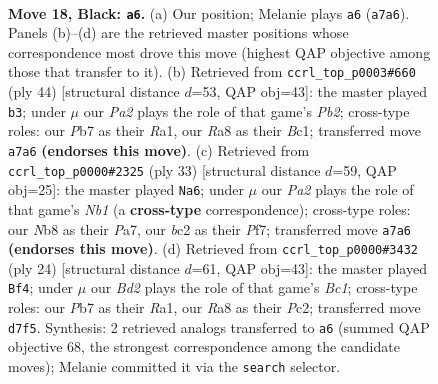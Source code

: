 \documentclass[11pt]{article}
\begin{document}
\clearpage

\begin{figure}[p]\centering
\begin{subfigure}{0.46\textwidth}\centering
\resizebox{\linewidth}{!}{%
\newchessgame
\chessboard[
  setfen={rn3r1b/pppb1k2/5pp1/4p2p/2P1P3/2N1BN2/PPB2PP1/R3K1R1 b - - 7 18},
  showmover=false,
  pgfstyle=straightmove, color=movearrow, markmove={a7-a6}
]}
\caption{}
\end{subfigure}\hfill
\begin{subfigure}{0.46\textwidth}\centering
\resizebox{\linewidth}{!}{%
\newchessgame
\chessboard[
  setfen={1r2r1k1/1pp2ppp/p2b1n2/3P4/2nN4/6P1/PP3PBP/R1BR2K1 w - - 10 23},
  showmover=false,
  pgfstyle=straightmove, color=movearrow, markmove={b2-b3}
]}
\caption{}
\end{subfigure}
\\[4pt]
\begin{subfigure}{0.46\textwidth}\centering
\resizebox{\linewidth}{!}{%
\newchessgame
\chessboard[
  setfen={rn3rk1/pp2ppbp/2p3p1/4P3/2NP4/4B3/PP3PPP/2R1K2R b K - 0 17},
  showmover=false,
  pgfstyle=straightmove, color=movearrow, markmove={b8-a6}
]}
\caption{}
\end{subfigure}\hfill
\begin{subfigure}{0.46\textwidth}\centering
\resizebox{\linewidth}{!}{%
\newchessgame
\chessboard[
  setfen={r3k2r/1pp1bppp/p3bn2/2p5/4P3/2NP1N1P/PPP2KP1/R1B2R2 w kq - 1 13},
  showmover=false,
  pgfstyle=straightmove, color=movearrow, markmove={c1-f4}
]}
\caption{}
\end{subfigure}
\caption{\textbf{Move 18, Black: \texttt{a6}.} (a) Our position; Melanie plays \texttt{a6} (\texttt{a7a6}). Panels (b)--(d) are the retrieved master positions whose correspondence most drove this move (highest QAP objective among those that transfer to it). (b) Retrieved from \texttt{ccrl\_top\_p0003\#660} (ply 44) [structural distance $d$=53, QAP obj=43]: the master played \texttt{b3}; under $\mu$ our \emph{Pa2} plays the role of that game's \emph{Pb2}; cross-type roles: our \emph{P}b7 as their \emph{R}a1, our \emph{R}a8 as their \emph{B}c1; transferred move \texttt{a7a6} \textbf{(endorses this move)}. (c) Retrieved from \texttt{ccrl\_top\_p0000\#2325} (ply 33) [structural distance $d$=59, QAP obj=25]: the master played \texttt{Na6}; under $\mu$ our \emph{Pa2} plays the role of that game's \emph{Nb1} (a \textbf{cross-type} correspondence); cross-type roles: our \emph{N}b8 as their \emph{P}a7, our \emph{b}c2 as their \emph{P}f7; transferred move \texttt{a7a6} \textbf{(endorses this move)}. (d) Retrieved from \texttt{ccrl\_top\_p0000\#3432} (ply 24) [structural distance $d$=61, QAP obj=43]: the master played \texttt{Bf4}; under $\mu$ our \emph{Bd2} plays the role of that game's \emph{Bc1}; cross-type roles: our \emph{P}b7 as their \emph{R}a1, our \emph{R}a8 as their \emph{P}c2; transferred move \texttt{d7f5}. Synthesis: 2 retrieved analogs transferred to \texttt{a6} (summed QAP objective 68, the strongest correspondence among the candidate moves); Melanie committed it via the \texttt{search} selector.}
\label{fig:thought-m35}
\end{figure}
\end{document}
